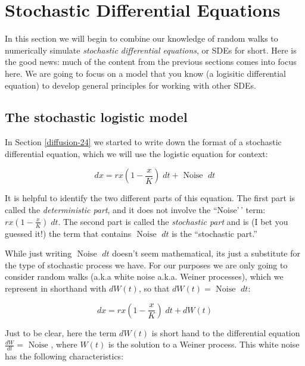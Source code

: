 \documentclass[
]{book}
\theoremstyle{definition}
\theoremstyle{definition}
\theoremstyle{definition}
\theoremstyle{remark}
\begin{document}
\hypertarget{sdes-25}{%
\chapter{Stochastic Differential Equations}\label{sdes-25}}

In this section we will begin to combine our knowledge of random walks to numerically simulate \emph{stochastic differential equations}, or SDEs for short. Here is the good news: much of the content from the previous sections comes into focus here. We are going to focus on a model that you know (a logisitic differential equation) to develop general principles for working with other SDEs.

\hypertarget{the-stochastic-logistic-model}{%
\section{The stochastic logistic model}\label{the-stochastic-logistic-model}}

In Section \ref{diffusion-24} we started to write down the format of a stochastic differential equation, which we will use the logistic equation for context:

\begin{equation}
dx = rx \left(1 - \frac{x}{K} \right) \; dt + \mbox{ Noise } \; dt   \label{eq:logistic-sde-25}
\end{equation}

It is helpful to identify the two different parts of this equation. The first part is called the \emph{deterministic part}, and it does not involve the ``Noise'\,' term: \(\displaystyle rx \left(1 - \frac{x}{K} \right) \; dt\). The second part is called the \emph{stochastic part} and is (I bet you guessed it!) the term that contains \(\mbox{ Noise } \; dt\) is the ``stochastic part.''

While just writing \(\mbox{ Noise } \; dt\) doesn't seem mathematical, its just a substitute for the type of stochastic process we have. For our purposes we are only going to consider random walks (a.k.a white noise a.k.a. Weiner processes), which we represent in shorthand with \(dW(t)\), so that \(dW(t)=\mbox{ Noise } \; dt\):

\begin{equation}
dx = rx \left(1 - \frac{x}{K} \right) \; dt + dW(t)   \label{eq:logistic-stochastic-sde}
\end{equation}

Just to be clear, here the term \(dW(t)\) is short hand to the differential equation \(\displaystyle \frac{dW}{dt} = \mbox{ Noise }\), where \(W(t)\) is the solution to a Weiner process. This white noise has the following characteristics:
\end{document}
